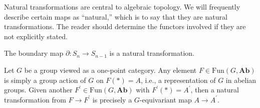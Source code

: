 Natural transformations are central to algebraic topology. We will frequently describe certain maps as ``natural,'' which is to say that they are natural transformations. The reader should determine the functors involved if they are not explicitly stated.
\begin{example}
The boundary map $\partial\colon S_n\to S_{n-1}$ is a natural transformation.

Let $G$ be a group viewed as a one-point category. Any element $F\in\mathrm{Fun}(G,\mathbf{Ab})$ is simply a group action of $G$ on $F(\ast)=A$, i.e., a representation of $G$ in abelian groups. Given another $F^\prime\in\mathrm{Fun}(G,\mathbf{Ab})$ with $F^\prime(\ast)=A^\prime$, then a natural transformation from $F\to F^\prime$ is precisely a $G$-equivariant map $A\to A^\prime$.
\end{example}
